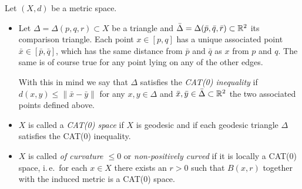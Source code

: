 \begin{defin}
  Let \((X,d)\) be a metric space.\vspace{-6pt}
  \label{def:cat}
  \begin{itemize}
  \item Let \(\Delta = \Delta(p,q,r) \subset X\) be a triangle and \(\bar \Delta = \Delta(\bar p, \bar q, \bar r) \subset \mathbb{R}^2\) its comparison triangle. Each point \(x \in [p,q]\) has a unique associated point \(\bar x \in [\bar p, \bar q]\), which has the same distance from \(\bar p\) and \(\bar q\) as \(x\) from \(p\) and \(q\). The same is of course true for any point lying on any of the other edges.

    With this in mind we say that \(\Delta\) satisfies the \emph{CAT(0) inequality} if \(d(x,y) \leq \|\bar x- \bar y\|\) for any \(x, y \in \Delta\) and \(\bar x, \bar y \in \bar \Delta \subset \mathbb{R}^2\) the two associated points defined above.
  \item \(X\) is called a \emph{CAT(0) space} if \(X\) is geodesic and if each geodesic triangle \(\Delta\) satisfies the CAT(0) inequality.
  \item \(X\) is called \emph{of curvature \(\leq 0\)} or \emph{non-positively curved} if it is locally a CAT(\(0\)) space, i.\,e.\ for each \(x \in X\) there exists an \(r > 0\) such that \(B(x,r)\) together with the induced metric is a CAT(\(0\)) space.
  \end{itemize}
\end{defin}

